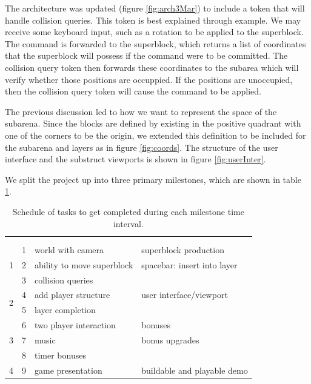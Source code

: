 The architecture was updated (figure \ref{fig:arch3Mar}) to include a token
that will handle collision queries. This token is best explained through
example. We may receive some keyboard input, such as a rotation to be applied
to the superblock. The command is forwarded to the superblock, which returns a
list of coordinates that the superblock will possess if the command were to be
committed. The collision query token then forwards these coordinates to the
subarea which will verify whether those positions are occuppied. If the
positions are unoccupied, then the collision query token will cause the command
to be applied.

The previous discussion led to how we want to represent the space of the
subarena. Since the blocks are defined by existing in the positive quadrant
with one of the corners to be the origin, we extended this definition to be
included for the subarena and layers as in figure \ref{fig:coords}. The
structure of the user interface and the substruct viewports is shown in figure
\ref{fig:userInter}.

We split the project up into three primary milestones, which are shown in table
\ref{tab:milestones}.

\begin{table}[!h]
	\centering
	\begin{tabular}{ | l | l | p{6cm} p{6cm} |}
		\hline
			& & & \\[1pt]
			\tb{Milestone} & \tb{Week} & \multicolumn{2}{c|}{\tb{Tasks}} \\[10pt]
		\hline
			\multirow{3}{*}{1} & 1 & world with camera & superblock production \\
			& 2 & ability to move superblock & spacebar: insert into layer \\
			& 3 & collision queries & \\
		\hline
			\multirow{2}{*}{2} & 4 & add player structure & user interface/viewport \\
			& 5 & layer completion & \\
		\hline
			\multirow{3}{*}{3} & 6 & two player interaction & bonuses \\
			& 7 & music & bonus upgrades \\
			& 8 & timer bonuses & \\
		\hline
			4 & 9 & game presentation & buildable and playable demo \\
		\hline
	\end{tabular}
	\caption{Schedule of tasks to get completed during each milestone time interval.}
	\label{tab:milestones}
\end{table}




